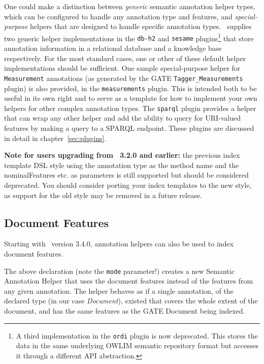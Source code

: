 One could make a distinction between {\em generic} semantic annotation helper
types, which can be configured to handle any annotation type and features, and
{\em special-purpose} helpers that are designed to handle specific annotation
types.  \Mimir\ supplies two generic helper implementations in the {\tt db-h2}
and {\tt sesame} plugins\footnote{A third implementation in the {\tt ordi}
plugin is now deprecated.  This stores the data in the same underlying OWLIM
semantic repository format but accesses it through a different API
abstraction.} that store annotation information in a relational database and a
knowledge base respectively.  For the most standard cases, one or other of
these default helper implementations should be sufficient.  One sample
special-purpose helper for {\tt Measurement} annotations (as generated by the
GATE {\tt Tagger\_Measurements} plugin) is also provided, in the
{\tt measurements} plugin.  This is intended both to be useful in its own right
and to serve as a template for how to implement your own helpers for other
complex annotation types.  The {\tt sparql} plugin provides a helper that can
wrap any other helper and add the ability to query for URI-valued features by
making a query to a SPARQL endpoint.  These plugins are discussed in detail in
chapter~\ref{sec:plugins}.

{\bf Note for users upgrading from \Mimir\ 3.2.0 and earlier:} the previous
index template DSL style using the annotation type as the method name and the
nominalFeatures etc. as parameters is still supported but should be considered
deprecated.  You should consider porting your index templates to the new style,
as support for the old style may be removed in a future release.

\subsection*{Document Features}\label{sec:indexing:docfeats}
Starting with \Mimir\ version 3.4.0, annotation helpers can also be used to
index document features.
\clearpage
{}

The above declaration (note the {\tt mode} parameter!) creates a new Semantic
Annotation Helper that uses the document features instead of the features from
any given annotation. The helper behaves as if a single annotation, of the
declared type (in our case {\it Document}), existed that covers the whole extent
of the document, and has the same features as the GATE Document being indexed.

